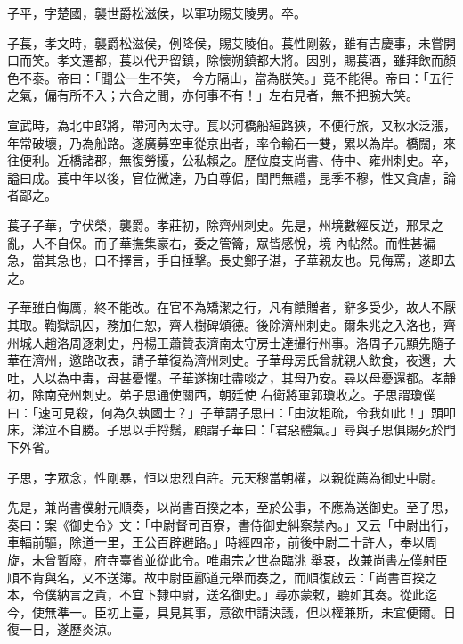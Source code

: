 \begin{pinyinscope}
 子平，字楚國，襲世爵松滋侯，以軍功賜艾陵男。卒。



 子萇，孝文時，襲爵松滋侯，例降侯，賜艾陵伯。萇性剛毅，雖有吉慶事，未嘗開口而笑。孝文遷都，萇以代尹留鎮，除懷朔鎮都大將。因別，賜萇酒，雖拜飲而顏色不泰。帝曰：「聞公一生不笑，
 今方隔山，當為朕笑。」竟不能得。帝曰：「五行之氣，偏有所不入；六合之間，亦何事不有！」左右見者，無不把腕大笑。



 宣武時，為北中郎將，帶河內太守。萇以河橋船絙路狹，不便行旅，又秋水泛漲，年常破壞，乃為船路。遂廣募空車從京出者，率令輸石一雙，累以為岸。橋闊，來往便利。近橋諸郡，無復勞擾，公私賴之。歷位度支尚書、侍中、雍州刺史。卒，謚曰成。萇中年以後，官位微達，乃自尊倨，閨門無禮，昆季不穆，性又貪虐，論者鄙之。



 萇子子華，字伏榮，襲爵。孝莊初，除齊州刺史。先是，州境數經反逆，邢杲之亂，人不自保。而子華撫集豪右，委之管籥，眾皆感悅，境
 內帖然。而性甚褊急，當其急也，口不擇言，手自捶擊。長史鄭子湛，子華親友也。見侮罵，遂即去之。



 子華雖自悔厲，終不能改。在官不為矯潔之行，凡有饋贈者，辭多受少，故人不厭其取。鞫獄訊囚，務加仁恕，齊人樹碑頌德。後除濟州刺史。爾朱兆之入洛也，齊州城人趙洛周逐刺史，丹楊王蕭贊表濟南太守房士達攝行州事。洛周子元顯先隨子華在濟州，邀路改表，請子華復為濟州刺史。子華母房氏曾就親人飲食，夜還，大吐，人以為中毒，母甚憂懼。子華遂掬吐盡啖之，其母乃安。尋以母憂還都。孝靜初，除南兗州刺史。弟子思通使關西，朝廷使
 右衛將軍郭瓊收之。子思謂瓊僕曰：「速可見殺，何為久執國士？」子華謂子思曰：「由汝粗疏，令我如此！」頭叩床，涕泣不自勝。子思以手捋鬚，顧謂子華曰：「君惡體氣。」尋與子思俱賜死於門下外省。



 子思，字眾念，性剛暴，恒以忠烈自許。元天穆當朝權，以親從薦為御史中尉。



 先是，兼尚書僕射元順奏，以尚書百揆之本，至於公事，不應為送御史。至子思，奏曰：案《御史令》文：「中尉督司百寮，書侍御史糾察禁內。」又云「中尉出行，車輻前驅，除道一里，王公百辟避路。」時經四帝，前後中尉二十許人，奉以周旋，未曾暫廢，府寺臺省並從此令。唯肅宗之世為臨洮
 舉哀，故兼尚書左僕射臣順不肯與名，又不送簿。故中尉臣酈道元舉而奏之，而順復啟云：「尚書百揆之本，令僕納言之貴，不宜下隸中尉，送名御史。」尋亦蒙敕，聽如其奏。從此迄今，使無準一。臣初上臺，具見其事，意欲申請決議，但以權兼斯，未宜便爾。日復一日，遂歷炎涼。




\end{pinyinscope}
